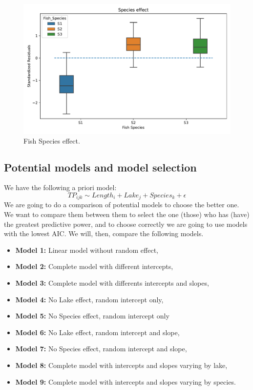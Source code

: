 \documentclass{article}
\begin{document}
\begin{figure}[h!]
    \centering
    \includegraphics[scale = 0.7]{images/boxplot_species_effect.pdf}
    \caption{Fish Species effect.}
    \label{boxplot_species}
\end{figure}

\subsection{Potential models and model selection}
We have the following a priori model:
\begin{equation*}
    TP_{ijk} \sim Length_i + Lake_j + Species_k + \epsilon
\end{equation*}
We are going to do a comparison of potential models to choose the better one. We want to compare them between them to select the one (those) who has (have) the greatest predictive power, and to choose correctly we are going to use models with the lowest AIC. We will, then, compare the following models.

\begin{itemize}
    \item \textbf{Model 1:} Linear model without random effect,
    \item \textbf{Model 2:} Complete model with different intercepts, 
    \item \textbf{Model 3:} Complete model with differents intercepts and slopes,
    \item \textbf{Model 4:} No Lake effect, random intercept only,
    \item \textbf{Model 5:} No Species effect, random intercept only
    \item \textbf{Model 6:} No Lake effect, random intercept and slope,
    \item \textbf{Model 7:} No Species effect, random intercept and slope,
    \item \textbf{Model 8:} Complete model with intercepts and slopes varying by lake, 
    \item \textbf{Model 9:} Complete model with intercepts and slopes varying by species.
\end{itemize}
\end{document}
